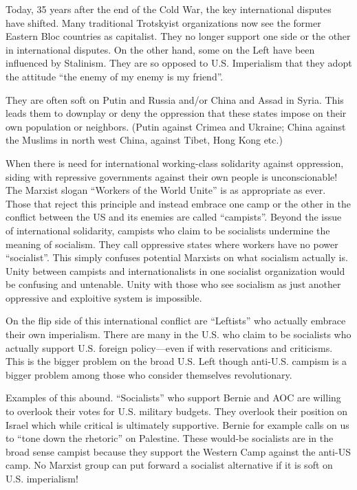 Today, 35 years after the end of the Cold War, the key international disputes have shifted. Many traditional Trotskyist organizations now see the former Eastern Bloc countries as capitalist. They no longer support one side or the other in international disputes. On the other hand, some on the Left have been influenced by Stalinism. They are so opposed to U.S. Imperialism that they adopt the attitude ``the enemy of my enemy is my friend''.

They are often soft on Putin and Russia and/or China and Assad in Syria. This leads them to downplay or deny the oppression that these states impose on their own population or neighbors. (Putin against Crimea and Ukraine; China against the Muslims in north west China, against Tibet, Hong Kong etc.)

When there is need for international working-class solidarity against oppression, siding with repressive governments against their own people is unconscionable! The Marxist slogan ``Workers of the World Unite'' is as appropriate as ever. Those that reject this principle and instead embrace one camp or the other in the conflict between the US and its enemies are called ``campists''. Beyond the issue of international solidarity, campists who claim to be socialists undermine the meaning of socialism. They call oppressive states where workers have no power ``socialist''. This simply confuses potential Marxists on what socialism actually is. Unity between campists and internationalists in one socialist organization would be confusing and untenable. Unity with those who see socialism as just another oppressive and exploitive system is impossible.

On the flip side of this international conflict are ``Leftists'' who actually embrace their own imperialism. There are many in the U.S. who claim to be socialists who actually support U.S. foreign policy---even if with reservations and criticisms. This is the bigger problem on the broad U.S. Left though anti-U.S. campism is a bigger problem among those who consider themselves revolutionary.

Examples of this abound. ``Socialists'' who support Bernie and AOC are willing to overlook their votes for U.S. military budgets. They overlook their position on Israel which while critical is ultimately supportive. Bernie for example calls on us to ``tone down the rhetoric'' on Palestine. These would-be socialists are in the broad sense campist because they support the Western Camp against the anti-US camp. No Marxist group can put forward a socialist alternative if it is soft on U.S. imperialism!

